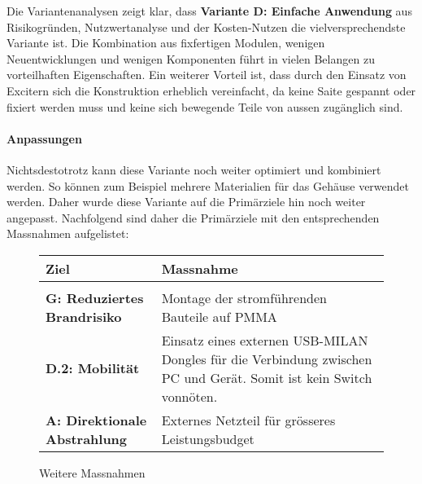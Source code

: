 Die Variantenanalysen zeigt klar, dass \textbf{Variante D: Einfache Anwendung} aus Risikogründen, Nutzwertanalyse und der Kosten-Nutzen die vielversprechendste Variante ist. Die Kombination aus fixfertigen Modulen, wenigen Neuentwicklungen und wenigen Komponenten führt in vielen Belangen zu vorteilhaften Eigenschaften. Ein weiterer Vorteil ist, dass durch den Einsatz von Excitern sich die Konstruktion erheblich vereinfacht, da keine Saite gespannt oder fixiert werden muss und keine sich bewegende Teile von aussen zugänglich sind.
\paragraph{Anpassungen}Nichtsdestotrotz kann diese Variante noch weiter optimiert und kombiniert werden. So können zum Beispiel mehrere Materialien für das Gehäuse verwendet werden. Daher wurde diese Variante auf die Primärziele hin noch weiter angepasst. Nachfolgend sind daher die Primärziele mit den entsprechenden Massnahmen aufgelistet:\\
\begin{figure}[H]
	\centering
	\begin{tabularx}{/5}{lX}
		{\large \textbf{Ziel}} & {\large Massnahme}\\
		\midrule\vspace{-6mm}\\
		\textbf{G: Reduziertes Brandrisiko}&Montage der stromführenden Bauteile auf PMMA\\
		\vspace{2mm}\textbf{D.2: Mobilität}&Einsatz eines externen USB-MILAN Dongles für die Verbindung zwischen PC und Gerät. Somit ist kein Switch vonnöten.\\
		\vspace{2mm}\textbf{A: Direktionale Abstrahlung}&Externes Netzteil für grösseres Leistungsbudget\\
		\bottomrule
	\end{tabularx}
	\caption{Weitere Massnahmen}
\end{figure}

